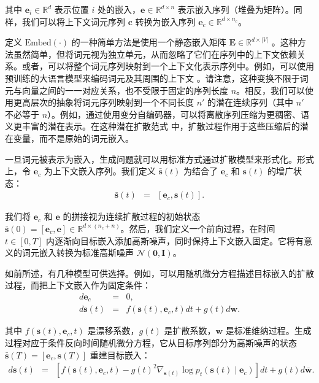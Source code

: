\documentclass[UTF8,a4paper,zihao=-4,oneside,openany]{ctexbook}
\begin{document}
\noindent 其中 $\mathbf{e}_i \in \mathbb{R}^d$ 表示位置 $i$ 处的嵌入，$\mathbf{e} \in \mathbb{R}^{d \times n}$ 表示嵌入序列（堆叠为矩阵）。同样，我们可以将上下文词元序列 $\mathbf{c}$ 转换为嵌入序列 $\mathbf{e}_{c} \in \mathbb{R}^{d \times n_c}$。

定义 $\mathrm{Embed}(\cdot)$ 的一种简单方法是使用一个静态嵌入矩阵 $\mathbf{E} \in \mathbb{R}^{d \times |V|}$ \citep{mikolov-etal:2013efficient,mikolov-etal:2013distributed}。这种方法虽然简单，但将词元视为独立单元，从而忽略了它们在序列中的上下文依赖关系。或者，可以将整个词元序列映射到一个上下文化表示序列中。例如，可以使用预训练的大语言模型来编码词元及其周围的上下文 \citep{devlin-etal:2019bert,brown-etal:2020language}。请注意，这种变换不限于词元与向量之间的一一对应关系，也不受限于固定的序列长度 $n$。相反，我们可以使用更高层次的抽象将词元序列映射到一个不同长度 $n'$ 的潜在连续序列（其中 $n'$ 不必等于 $n$）。例如，通过使用变分自编码器，可以将离散序列压缩为更稠密、语义更丰富的潜在表示。在这种潜在扩散范式 \citep{rombach-etal:2022high} 中，扩散过程作用于这些压缩后的潜在变量，而不是原始的词元嵌入。

一旦词元被表示为嵌入，生成问题就可以用标准方式通过扩散模型来形式化。形式上，令 $\mathbf{e}_c$ 为上下文嵌入序列。我们定义 $\bar{\mathbf{s}}(t)$ 为结合了 $\mathbf{e}_c$ 和 $\mathbf{s}(t)$ 的增广状态：
\begin{eqnarray}
\bar{\mathbf{s}}(t) & = & [\mathbf{e}_c, \mathbf{s}(t)].
\end{eqnarray}

我们将 $\mathbf{e}_c$ 和 $\mathbf{e}$ 的拼接视为连续扩散过程的初始状态 $\bar{\mathbf{s}}(0) = [\mathbf{e}_c,\mathbf{e}] \in \mathbb{R}^{d \times (n_c + n)}$。然后，我们定义一个前向过程，在时间 $t \in [0, T]$ 内逐渐向目标嵌入添加高斯噪声，同时保持上下文嵌入固定。它将有意义的词元嵌入转换为标准高斯噪声 $\mathcal{N}(\mathbf{0}, \mathbf{I})$。

如前所述，有几种模型可供选择。例如，可以用随机微分方程描述目标嵌入的扩散过程，而把上下文嵌入作为固定条件：
\begin{eqnarray}
d\mathbf{e}_c & = & 0, \nonumber\\
d \mathbf{s}(t) & = & f(\mathbf{s}(t),\mathbf{e}_c,t) d t + g(t) d\mathbf{w}.
\label{eq:diffusion-embedding}\label{eq:diffusion-embedding-nobar}
\end{eqnarray}

\noindent 其中 $f(\mathbf{s}(t),\mathbf{e}_c,t)$ 是漂移系数，$g(t)$ 是扩散系数，$\mathbf{w}$ 是标准维纳过程。生成过程对应于条件反向时间随机微分方程，它从目标序列部分为高斯噪声的状态 $\bar{\mathbf{s}}(T)=[\mathbf{e}_c,\mathbf{s}(T)]$ 重建目标嵌入：
\begin{eqnarray}
d \mathbf{s}(t) & = & \left[f(\mathbf{s}(t),\mathbf{e}_c,t)-g(t)^2\nabla_{\mathbf{s}(t)}
\log p_t(\mathbf{s}(t)\mid\mathbf{e}_c)\right]dt+g(t)d\bar{\mathbf{w}}.
\label{eq:generation-embedding}\label{eq:generation-embedding-nobar}
\end{eqnarray}
\end{document}
